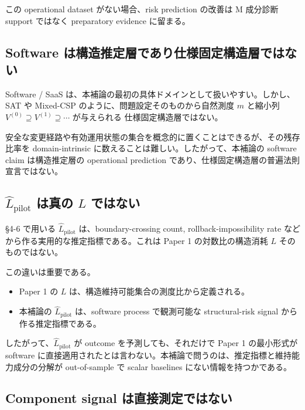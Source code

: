 \documentclass[12pt,a4paper]{article}
\begin{document}
この operational dataset がない場合、risk prediction の改善は M 成分診断 support ではなく preparatory evidence に留まる。

\subsection{Software は構造推定層であり仕様固定構造層ではない}\label{software-ux306fux69cbux9020ux63a8ux5b9aux5c64ux3067ux3042ux308aux4ed5ux69d8ux56faux5b9aux69cbux9020ux5c64ux3067ux306fux306aux3044}

Software / SaaS は、本補論の最初の具体ドメインとして扱いやすい。しかし、SAT や Mixed-CSP のように、問題設定そのものから自然測度 \(m\) と縮小列 \(V^{(0)} \supseteq V^{(1)} \supseteq \cdots\) が与えられる 仕様固定構造層ではない。

安全な変更経路や有効運用状態の集合を概念的に置くことはできるが、その残存比率を domain-intrinsic に数えることは難しい。したがって、本補論の software claim は構造推定層の operational prediction であり、仕様固定構造層の普遍法則宣言ではない。

\subsection{\texorpdfstring{\(\hat L_{\mathrm{pilot}}\) は真の \(L\) ではない}{\textbackslash hat L\_\{\textbackslash mathrm\{pilot\}\} は真の L ではない}}\label{hat-l_mathrmpilot-ux306fux771fux306e-l-ux3067ux306fux306aux3044}

§4-6 で用いる \(\hat L_{\mathrm{pilot}}\) は、boundary-crossing count, rollback-impossibility rate などから作る実用的な推定指標である。これは Paper 1 の対数比の構造消耗 \(L\) そのものではない。

この違いは重要である。

\begin{itemize}
\tightlist
\item
  Paper 1 の \(L\) は、構造維持可能集合の測度比から定義される。
\item
  本補論の \(\hat L_{\mathrm{pilot}}\) は、software process で観測可能な structural-risk signal から作る推定指標である。
\end{itemize}

したがって、\(\hat L_{\mathrm{pilot}}\) が outcome を予測しても、それだけで Paper 1 の最小形式が software に直接適用されたとは言わない。本補論で問うのは、推定指標と維持能力成分の分解が out-of-sample で scalar baselines にない情報を持つかである。

\subsection{Component signal は直接測定ではない}\label{component-signal-ux306fux76f4ux63a5ux6e2cux5b9aux3067ux306fux306aux3044}
\end{document}

